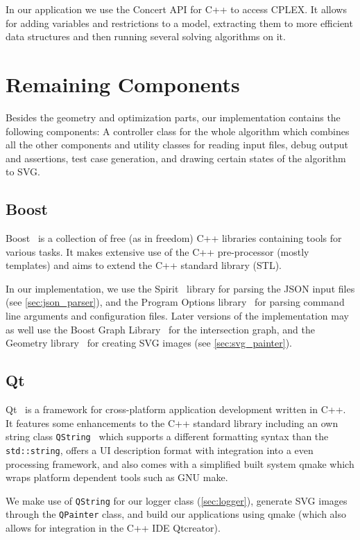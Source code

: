 In our application we use the Concert API for C++ \cite{cplex_concert}
to access CPLEX. It allows for adding variables and restrictions to
a model, extracting them to more efficient data structures and then
running several solving algorithms on it.

\section{Remaining Components}
Besides the geometry and optimization parts, our implementation
contains the following components: A controller
class for the whole algorithm which combines all the other components
and utility classes for reading input files, debug
output and assertions, test case generation, and drawing certain 
states of the algorithm to SVG.

\subsection{Boost}
\label{sec:boost}
Boost~\cite{boost} is a collection of free (as in freedom) C++
libraries containing tools for various tasks. It makes extensive use
of the C++ pre-processor (mostly templates) and aims to extend the
C++ standard library (STL).

In our implementation, we use the Spirit~\cite{boost_spirit} library
for parsing the JSON input files (see \cref{sec:json_parser}), and
the Program Options library~\cite{boost_program_options} for parsing
command line arguments and configuration files. Later versions of the
implementation may as well use the Boost Graph
Library~\cite{boost_graph} for the intersection graph, and the
Geometry library~\cite{boost_geometry} for creating SVG images
(see \cref{sec:svg_painter}).

\subsection{Qt}
\label{sec:Qt}
Qt~\cite{qt} is a framework for cross-platform application development
written in C++. It features some enhancements to the C++ standard
library including an own string class
\verb|QString|~\cite{qt_manual_qstring} which supports
a different formatting syntax than the \verb|std::string|, offers
a UI description format with integration into a even processing
framework, and also comes with a simplified built system qmake which
wraps platform dependent tools such as GNU make.

We make use of \verb|QString| for our logger class
(\cref{sec:logger}), generate SVG images through the \verb|QPainter|
class, and build our applications using qmake (which also allows
for integration in the C++ IDE Qtcreator).


